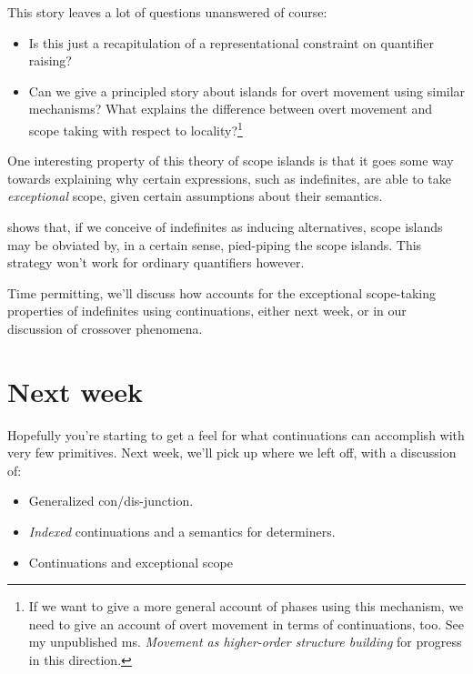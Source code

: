\documentclass[nols,twoside,nofonts,nobib,nohyper]{tufte-handout}
\begin{document}
This story leaves a lot of questions unanswered of course:

\begin{itemize}

    \item Is this just a recapitulation of a representational constraint on
    quantifier raising?

    \item Can we give a principled story about islands for overt movement using
    similar mechanisms? What explains the difference between overt movement and
    scope taking with respect to locality?\footnote{If we want to give a more
    general account of phases using this mechanism, we need to give an account
    of overt movement in terms of continuations, too. See my unpublished ms.
    \textit{Movement as higher-order structure building} for progress in this direction.}

\end{itemize}

One interesting property of this theory of scope islands is that it goes
some way towards explaining why certain expressions, such as indefinites, are able to take
\textit{exceptional} scope, given certain assumptions about their semantics.

\citet{Charlowc} shows that, if we conceive of indefinites as inducing
alternatives, scope islands may be obviated by, in a certain sense, pied-piping
the scope islands. This strategy won't work for ordinary quantifiers
however.

Time permitting, we'll discuss how \citeauthor{Charlowc} accounts for the
exceptional scope-taking properties of indefinites using continuations, either
next week, or in our discussion of crossover phenomena.

\section{Next week}

Hopefully you're starting to get a feel for what continuations can accomplish
with very few primitives. Next week, we'll pick up where we left off, with a
discussion of:

\begin{itemize}

  \item Generalized con/dis-junction.

  \item \textit{Indexed} continuations and a semantics for determiners.

  \item Continuations and exceptional scope

\end{itemize}
\end{document}
